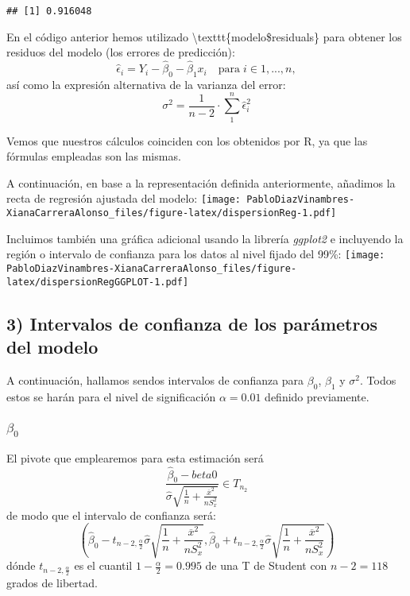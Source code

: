 \documentclass[
]{article}
\begin{document}
\begin{verbatim}
## [1] 0.916048
\end{verbatim}

En el código anterior hemos utilizado
\textbackslash texttt\{modelo\$residuals\} para obtener los residuos del
modelo (los errores de predicción): \[
\hat\epsilon_i = Y_i - \hat\beta_0 - \hat\beta_1x_i \quad \text{para} \; i \in {1,...,n},
\] así como la expresión alternativa de la varianza del error: \[
\hat{\sigma^2} = \frac{1}{n-2} \cdot \sum_{1}^{n} \hat\epsilon_i^2
\]

Vemos que nuestros cálculos coinciden con los obtenidos por R, ya que
las fórmulas empleadas son las mismas.

A continuación, en base a la representación definida anteriormente,
añadimos la recta de regresión ajustada del modelo:
\texttt{[image: PabloDiazVinambres-XianaCarreraAlonso\_files/figure-latex/dispersionReg-1.pdf]}

Incluimos también una gráfica adicional usando la librería
\emph{ggplot2} e incluyendo la región o intervalo de confianza para los
datos al nivel fijado del 99\%:
\texttt{[image: PabloDiazVinambres-XianaCarreraAlonso\_files/figure-latex/dispersionRegGGPLOT-1.pdf]}

\hypertarget{intervalos-de-confianza-de-los-paruxe1metros-del-modelo}{%
\subsection{3) Intervalos de confianza de los parámetros del
modelo}\label{intervalos-de-confianza-de-los-paruxe1metros-del-modelo}}

A continuación, hallamos sendos intervalos de confianza para
\(\beta_0\), \(\beta_1\) y \(\sigma^2\). Todos estos se harán para el
nivel de significación \(\alpha = 0.01\) definido previamente.

\hypertarget{beta_0}{%
\subsubsection{\texorpdfstring{\(\beta_0\)}{\textbackslash beta\_0}}\label{beta_0}}

El pivote que emplearemos para esta estimación será \[
\frac{\hat\beta_0 - beta0}{\hat\sigma\sqrt{\frac{1}{n}+\frac{\overline{x}^2}{nS_x^2}}} \in T_{n_2}
\] de modo que el intervalo de confianza será: \[
(\hat\beta_0-t_{n-2,\frac{\alpha}{2}} \hat\sigma \sqrt{\frac{1}{n} +\frac{\overline{x}^2}{nS_x^2}}, \hat\beta_0+t_{n-2,\frac{\alpha}{2}} \hat\sigma \sqrt{\frac{1}{n} +\frac{\overline{x}^2}{nS_x^2}})
\] dónde \(t_{n-2,\frac{\alpha}{2}}\) es el cuantil
\(1-\frac{\alpha}{2} = 0.995\) de una T de Student con \(n-2= 118\)
grados de libertad.
\end{document}
